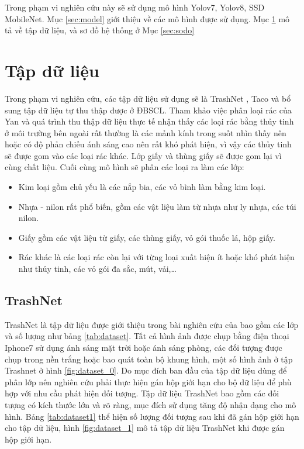 \documentclass[../the.tex]{subfiles}
\begin{document}
{\fontsize{13}{12} \selectfont

Trong phạm vi nghiên cứu này sẽ sử dụng mô hình Yolov7, Yolov8, SSD MobileNet. Mục \ref{sec:model} giới thiệu về các mô hình được sử dụng. Mục \ref{sec:dataset} mô tả về tập dữ liệu, và sơ đồ hệ thống ở Mục \ref{sec:sodo}

}
\section{Tập dữ liệu}
\label{sec:dataset}

{\fontsize{13}{12} \selectfont

	Trong phạm vi nghiên cứu, các tập dữ liệu sử dụng sẽ là TrashNet \cite{yang2016classification}, Taco \cite{proença2020taco} và bổ sung tập dữ liệu tự thu thập được ở ĐBSCL.
	Tham khảo việc phân loại rác của Yan \cite{yang2016classification} và quá trình thu thập dữ liệu thực tế nhận thấy các loại rác bằng thủy tinh ở môi trường bên ngoài rất thường là các mảnh kính trong suốt nhìn thấy nên hoặc có độ phản chiếu ánh sáng cao nên rất khó phát hiện, vì vậy các thủy tinh sẽ được gom vào các loại rác khác.
	Lớp giấy và thùng giấy sẽ được gom lại vì cùng chất liệu. Cuối cùng mô hình sẽ phân các loại ra làm các lớp:
	\begin{itemize}
		\item Kim loại gồm chủ yếu là các nắp bia, các vỏ bình làm bằng kim loại.
		\item Nhựa - nilon rất phổ biến, gồm các vật liệu làm từ nhựa như ly nhựa, các túi nilon.
		\item Giấy gồm các vật liệu từ giấy, các thùng giấy, vỏ gói thuốc lá, hộp giấy.
		\item Rác khác là các loại rác còn lại với từng loại xuất hiện ít hoặc khó phát hiện như thủy tinh, các vỏ gói đa sắc,
		      mút, vải,\dots
	\end{itemize}
}

\subsection{TrashNet}
\label{sec:trashnet}
{\fontsize{13}{12} \selectfont

	TrashNet là tập dữ liệu được giới thiệu trong bài nghiên cứu của \cite{yang2016classification} bao gồm các lớp và số lượng như bảng \ref{tab:dataset}. Tất cả hình ảnh được chụp bằng điện thoại Iphone7 sử dụng ánh sáng mặt trời hoặc ánh sáng phòng, các đối tượng được chụp trong nền trắng hoặc bao quát toàn bộ khung hình, một số hình ảnh ở tập Trashnet ở hình
	\ref{fig:dataset_0}.
	Do mục đích ban đầu của tập dữ liệu dùng để phân lớp nên nghiên cứu phải thực hiện gán hộp giới hạn cho bộ dữ liệu để phù hợp với nhu cầu phát hiện đối tượng. Tập dữ liệu TrashNet bao gồm các đối tượng có kích thước lớn và rõ ràng, mục đích sử dụng tăng độ nhận dạng cho mô hình. Bảng \ref{tab:dataset1} thể hiện số lượng đối tượng sau khi đã gán hộp giới hạn cho tập dữ liệu, hình
	\ref{fig:dataset_1} mô tả tập dữ liệu TrashNet khi được gán hộp giới hạn.

}
\end{document}
